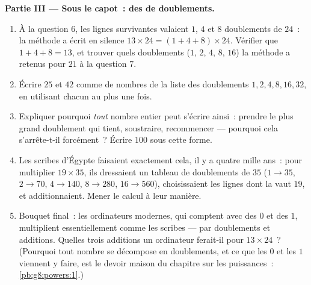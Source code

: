 \begin{problem}
\medskip
\noindent\textbf{Partie III --- Sous le capot~: des  de
doublements.}
\begin{enumerate}[resume]
  \item À la question 6, les lignes survivantes valaient $1$, $4$
        et $8$ doublements de $24$~: la méthode a écrit en silence
        $13 \times 24 = (1 + 4 + 8) \times 24$. Vérifier que
        $1 + 4 + 8 = 13$, et trouver quels doublements ($1$, $2$,
        $4$, $8$, $16$) la méthode a retenus pour $21$ à la
        question 7.
  \item Écrire $25$ et $42$ comme  de nombres de la liste des
        doublements $1, 2, 4, 8, 16, 32$, en utilisant chacun au
        plus une fois.
  \item Expliquer pourquoi \emph{tout} nombre entier peut s'écrire
        ainsi~: prendre le plus grand doublement qui tient,
        soustraire, recommencer --- pourquoi cela s'arrête-t-il
        forcément~? Écrire $100$ sous cette forme.
  \item Les scribes d'Égypte faisaient exactement cela, il y a
        quatre mille ans~: pour multiplier $19 \times 35$, ils
        dressaient un tableau de doublements de $35$
        ($1 \to 35$, $2 \to 70$, $4 \to 140$, $8 \to 280$,
        $16 \to 560$), choisissaient les lignes dont la  vaut
        $19$, et additionnaient. Mener le calcul à leur manière.
  \item Bouquet final~: les ordinateurs modernes, qui comptent avec
        des $0$ et des $1$, multiplient essentiellement comme les
        scribes --- par doublements et additions. Quelles trois
        additions un ordinateur ferait-il pour $13 \times 24$~?
        (Pourquoi tout nombre se décompose en doublements, et ce que
        les $0$ et les $1$ viennent y faire, est le devoir maison du
        chapitre sur les puissances~: \cref{pb:g8:powers:1}.)
\end{enumerate}
\end{problem}
